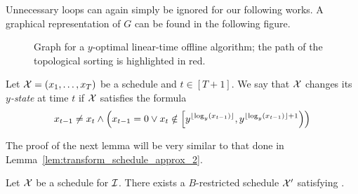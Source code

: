 Unnecessary loops can again simply be ignored for our following works.
A graphical representation of $G$ can be found in the following figure.
\begin{figure}[H]

\caption{Graph for a $y$-optimal linear-time offline algorithm; the path of the topological sorting is highlighted in red.}
\label{fig:graph_lin_approx_y}
\end{figure}

\begin{defn}
Let $\mathcal{X}=(x_1,\dotsc,x_T)$ be a schedule and $t\in[T+1]$. We say that $\mathcal{X}$ changes its \emph{$y$-state} at time $t$ if $\mathcal{X}$ satisfies the formula
\begin{equation*}
	x_{t-1}\neq x_t\land \left(x_{t-1}=0 \lor x_t\notin\left[y^{\lfloor\log_y(x_{t-1})\rfloor},y^{\lfloor\log_y(x_{t-1})\rfloor+1}\right)\right)
\end{equation*}
\end{defn}
The proof of the next lemma will be very similar to that done in Lemma~\ref{lem:transform_schedule_approx_2}.
\begin{lem}
Let $\mathcal{X}$ be a schedule for $\mathcal{I}$. There exists a $B$-restricted schedule $\mathcal{X}'$ satisfying .
\end{lem}

